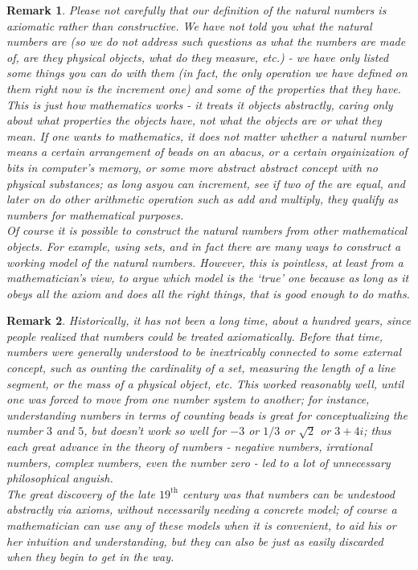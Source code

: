 \documentclass[a4paper,oneside]{book}
\newtheorem{remark}{Remark}[section]
\begin{document}
			\begin{remark}
				Please not carefully that our definition of the natural numbers is \textit{axiomatic} rather than \textit{constructive}. We have not told you what the natural numbers \textit{are} (so we do not address such questions as what the numbers are made of, are they physical objects, what do they measure, etc.) - we have only listed some things you can do with them (in fact, the only operation we have defined on them right now is the increment one) and some of the properties that they have.\\
				This is just how mathematics works - it treats it objects abstractly, caring only about what properties the objects have, not what the objects are or what they mean. If one wants to mathematics, it does not matter whether a natural number means a certain arrangement of beads on an abacus, or a certain orgainization of bits in computer's memory, or some more abstract abstract concept with no physical substances; as long asyou can increment, see if two of the are equal, and later on do other arithmetic operation such as add and multiply, they qualify as numbers for mathematical purposes.\\
				Of course it is possible to construct the natural numbers from other mathematical objects. For example, using sets, and in fact there are many ways to construct a working model of the natural numbers. However, this is pointless, at least from a mathematician's view, to argue which model is the `true' one because as long as it obeys all the axiom and does all the right things, that is good enough to do maths.
			\end{remark}
			\begin{remark}
				Historically, it has not been a long time, about a hundred years, since people realized that numbers could be treated axiomatically. Before that time, numbers were generally understood to be inextricably connected to some external concept, such as ounting the cardinality of a set, measuring the length of a line segment, or the mass of a physical object, etc. This worked reasonably well, until one was forced to move from one number system to another; for instance, understanding numbers in terms of counting beads is great for conceptualizing the number $3$ and $5$, but doesn't work so well for $-3$ or $1/3$ or $\sqrt{2}$ or $3+4i$; thus each great advance in the theory of numbers - negative numbers, irrational numbers, complex numbers, even the number zero - led to a lot of unnecessary philosophical anguish.\\
				The great discovery of the late $19^{\mathrm{th}}$ century was that numbers can be undestood abstractly via axioms, without necessarily needing a concrete model; of course a mathematician can use any of these models when it is convenient, to aid his or her intuition and understanding, but they can also be just as easily discarded when they begin to get in the way.
      \end{remark}
\end{document}
